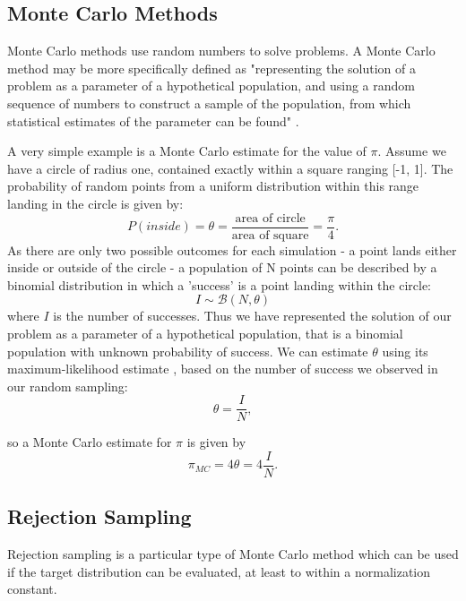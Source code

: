\documentclass[a4paper,11pt,twoside]{article}
\begin{document}
\subsection{Monte Carlo Methods}
Monte Carlo methods use random numbers to solve problems.  A Monte Carlo method
may be more specifically defined as
"representing the solution of a problem as a parameter of a hypothetical
population, and using a random sequence of numbers to construct a sample of the
population, from which statistical estimates of the parameter can be found"
\cite{halton}.  

A very simple example is a Monte Carlo estimate for the value of $\pi$. Assume we have a
circle of radius one, contained exactly within a square ranging [-1, 1]. The
probability of random points from a uniform distribution within this range
landing in the circle is given by:
\begin{equation}
	P(inside) = \theta = \frac{\text{area of circle}}{\text{area of square}} =
	\frac{\pi}{4}.
\end{equation}
As there are only two possible outcomes for each simulation - a point lands
either inside or outside of the circle - a  population of N points can be
described by a binomial distribution in which a 'success' is a point landing within
the circle:
\begin{equation}
	I \sim \mathcal{B}(N, \theta)
\end{equation}
where $I$ is the number of successes.
Thus we have represented the solution of our problem as a parameter of a
hypothetical population, that is a binomial population with unknown probability
of success.
We can estimate $\theta$ using its maximum-likelihood estimate \cite{som}, based
on the number of success we observed in our random sampling:
\begin{equation}
	\theta = \frac{I}{N},
\end{equation}

so a Monte Carlo estimate for $\pi$ is given by
\begin{equation}
	\pi_{MC} = 4 \theta = 4 \frac{I}{N}.
\end{equation}

\subsection{Rejection Sampling}
Rejection sampling is a particular type of Monte Carlo method which can be used
if the target distribution can be evaluated, at least to within a normalization
constant. 
\end{document}
